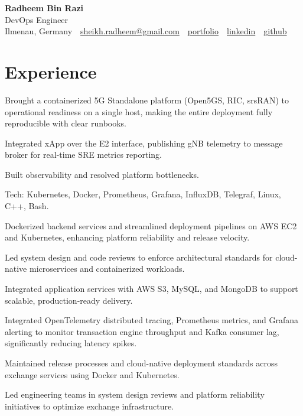 \documentclass[10pt,a4paper]{resume}
\makeatletter
\newcommand{\Portfolio}{https://radheem.github.io/my-cv}
\newcommand{\PortfolioText}{portfolio}
\newcommand{\GitHub}{https://github.com/radheem}
\newcommand{\LinkedIn}{https://www.linkedin.com/in/radheem-razi}
\newcommand{\Email}{sheikh.radheem@gmail.com}
\makeatother
\begin{document}
\begin{center}
  {\huge\bfseries Radheem Bin Razi}\\[3pt]
  {\large DevOps Engineer}\\[6pt]
  \small
  Ilmenau, Germany \,\textbar\,
  \href{mailto:\Email}{\Email} \,\textbar\,
  \href{\Portfolio}{\PortfolioText} \,\textbar\,
  \href{\LinkedIn}{linkedin} \,\textbar\,
  \href{\GitHub}{github}
\end{center}
\vspace{2pt}

\section{Experience}

\bullets
  \item Brought a containerized 5G Standalone platform (Open5GS, RIC, srsRAN) to operational readiness on a single host, making the entire deployment fully reproducible with clear runbooks.
  \item Integrated xApp over the E2 interface, publishing gNB telemetry to message broker for real-time SRE metrics reporting.
  \item Built observability and resolved platform bottlenecks.
  \item Tech: Kubernetes, Docker, Prometheus, Grafana, InfluxDB, Telegraf, Linux, C++, Bash.
\bulletsend
\vspace{1.5pt}
\bullets
  \item Dockerized backend services and streamlined deployment pipelines on AWS EC2 and Kubernetes, enhancing platform reliability and release velocity.
  \item Led system design and code reviews to enforce architectural standards for cloud-native microservices and containerized workloads.
  \item Integrated application services with AWS S3, MySQL, and MongoDB to support scalable, production-ready delivery.
\bulletsend
\vspace{1.5pt}
\bullets
  \item Integrated OpenTelemetry distributed tracing, Prometheus metrics, and Grafana alerting to monitor transaction engine throughput and Kafka consumer lag, significantly reducing latency spikes.
  \item Maintained release processes and cloud-native deployment standards across exchange services using Docker and Kubernetes.
  \item Led engineering teams in system design reviews and platform reliability initiatives to optimize exchange infrastructure.
\bulletsend
\vspace{1.5pt}
\end{document}
